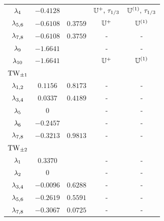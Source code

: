 \begin{table}[t]
\begin{center}
\begin{tabular}{ccccc}
  $\eigExp[4]$   &$-0.4128$ &          & $\bbU^+,\,\Shift_{1/3}$  & $\bbU^{(1)},\,\Shift_{1/3}$\\
  $\eigExp[5,6]$ &$-0.6108$ & $0.3759$ & $\bbU^+$     & $\bbU^{(1)}$\\
  $\eigExp[7,8]$ &$-0.6108$ & $0.3759$ & -         & -\\
  $\eigExp[9]$   &$-1.6641$ &          & -         & -\\
  $\eigExp[10]$  &$-1.6641$ &          & $\bbU^+$     & $\bbU^{(1)}$ \\[2ex]
$\REQV{\pm}{1}$&  &  & \\\hline
  $\eigExp[1,2]$ & $0.1156$ & $0.8173$ & -  & -\\
  $\eigExp[3,4]$ & $0.0337$ & $0.4189$ & -  & -\\
  $\eigExp[5]$   & $0$      &          & -  & -\\
  $\eigExp[6]$   &$-0.2457$ &          & -  & -\\
  $\eigExp[7,8]$ &$-0.3213$ & $0.9813$ & -  & -\\[2ex]
$\REQV{\pm}{2}$&  &  & \\\hline
  $\eigExp[1]  $ & $0.3370$ &          & -  & -\\
  $\eigExp[2]  $ & $0$      &          & -  & -\\
  $\eigExp[3,4]$ &$-0.0096$ & $0.6288$ & -  & -\\
  $\eigExp[5,6]$ &$-0.2619$ & $0.5591$ & -  & -\\
  $\eigExp[7,8]$ &$-0.3067$ & $0.0725$ & -  & -\\
\end{tabular}
\end{center}
\end{table}


